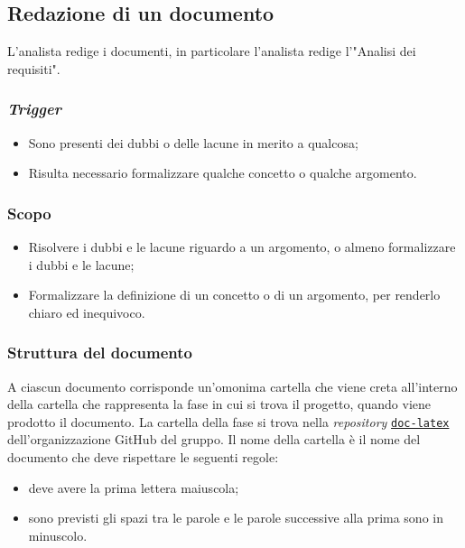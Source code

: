 \subsection{Redazione di un documento}
\label{redazione-documento}

L'analista redige i documenti, in particolare l'analista redige l'"Analisi dei
requisiti".

\subsubsection{\textit{Trigger}}
\begin{itemize}
	\item Sono presenti dei dubbi o delle lacune in merito a qualcosa;

	\item Risulta necessario formalizzare qualche concetto o qualche argomento.
\end{itemize}

\subsubsection{Scopo}
\begin{itemize}
	\item Risolvere i dubbi e le lacune riguardo a un argomento, o almeno
	      formalizzare i dubbi e le lacune;

	\item Formalizzare la definizione di un concetto o di un argomento, per
	      renderlo chiaro ed inequivoco.
\end{itemize}

\subsubsection{Struttura del documento}

A ciascun documento corrisponde un'omonima cartella che viene creta all'interno
della cartella che rappresenta la fase in cui si trova il progetto, quando viene
prodotto il documento. La cartella della fase si trova nella \textit{repository}
\href{https://github.com/Project-SWEnergy/doc-latex}{\texttt{doc-latex}}
dell'organizzazione GitHub del gruppo.
Il nome della cartella è il nome del documento che deve rispettare le seguenti
regole:
\begin{itemize}
	\item deve avere la prima lettera maiuscola;
	\item sono previsti gli spazi tra le parole e le parole successive alla
	      prima sono in minuscolo.
\end{itemize}

